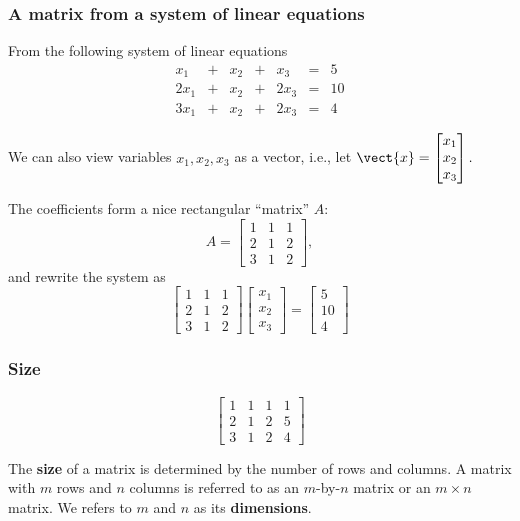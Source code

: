 \begin{frame}
  \frametitle{A matrix from a system of linear equations}
  {\small
  From the following system of linear equations
  \[
  \begin{array}{ccccccr}
    x_1 &+& x_2 &+& x_3 &=& 5\\
    2x_1 &+& x_2 &+& 2x_3 &=& 10\\
    3x_1 &+& x_2 &+& 2x_3 &=& 4
  \end{array}
  \]
  
  We can also view variables $x_1,x_2,x_3$ as a vector, i.e., let
  $  \vect{x} = 
  \begin{bmatrix}
    x_1\\
    x_2\\
    x_3
  \end{bmatrix}. $
  }
  
  \pause
  The coefficients form a nice rectangular ``matrix'' $A$:
  \[
  A =
  \begin{bmatrix}
    1 & 1 & 1 \\
    2 & 1 & 2 \\
    3 & 1 & 2
  \end{bmatrix},
  \]
  \pause
  and rewrite the system as
  \[
  \begin{bmatrix}
    1 & 1 & 1 \\
    2 & 1 & 2 \\
    3 & 1 & 2
  \end{bmatrix}
  \begin{bmatrix}
    x_1\\
    x_2\\
    x_3
  \end{bmatrix}
  =
  \begin{bmatrix}
    5\\
    10\\
    4
  \end{bmatrix}
  \]
\end{frame}

\begin{frame}
  \frametitle{Size}
  \[
  \begin{bmatrix}
    1 & 1 & 1 & 1\\
    2 & 1 & 2 & 5\\
    3 & 1 & 2 & 4
  \end{bmatrix}
  \]
  \pause

  The {\bf size} of a matrix is determined by the number of rows and
  columns.  A matrix with $m$ rows and $n$ columns is referred to as
  an $m$-by-$n$ matrix or an $m\times n$ matrix.  We refers to $m$ and
  $n$ as its {\bf dimensions}.
\end{frame}

